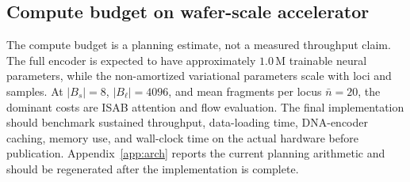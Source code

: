 \subsection{Compute budget on wafer-scale accelerator}
The compute budget is a planning estimate, not a measured throughput claim. The full encoder is expected to have approximately $1.0\,\text{M}$ trainable neural parameters, while the non-amortized variational parameters scale with loci and samples. At $|B_s|=8$, $|B_\ell|=4096$, and mean fragments per locus $\bar n=20$, the dominant costs are ISAB attention and flow evaluation. The final implementation should benchmark sustained throughput, data-loading time, DNA-encoder caching, memory use, and wall-clock time on the actual hardware before publication. Appendix~\ref{app:arch} reports the current planning arithmetic and should be regenerated after the implementation is complete.

